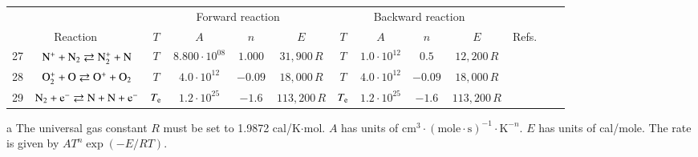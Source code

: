 \documentclass{warpdoc}
\renewcommand{\fontsizetable}{\footnotesize\scalefont{0.9}}
\begin{document}
\begin{table}[t]
\fontsizetable
\begin{center}
\begin{threeparttable}
\begin{tabular}{ccccccccccccc} 
\toprule
~&~&\multicolumn{4}{c}{Forward reaction} & \multicolumn{4}{c}{Backward reaction} & ~\\
 \cmidrule(lr){3-6}\cmidrule(lr){7-10}
\multicolumn{2}{c}{Reaction} & $T$ & $A$ & $n$ & $E$ & $T$  & $A$ & $n$ & $E$ & \multicolumn{1}{c}{Refs.}\\ 
\midrule                                          
27 & $\rm N^{+} + N_2 \rightleftarrows N_2^{+} + N $ &$T$ & $8.800 \cdot 10^{08}$ & $1.000$ & $31,900 \, R$ 
                                          &$T$ & $1.0 \cdot 10^{12}$ & $0.5$ & $12,200\, R$ & \cite{book:1990:park} \\
                                          
28 & $\rm O_2^{+} + O \rightleftarrows O^{+} + O_2$ &$T$ & $4.0 \cdot 10^{12}$ & $-0.09$ & $18,000\, R$ 
                                          &$T$ & $4.0 \cdot 10^{12}$ & $-0.09$ & $18,000\, R$ & \cite{book:1990:park} \\
                                          
                                          
29 & $\rm N_2 + e^{-} \rightleftarrows N + N + e^{-}$ &$T_{\rm e}$ & $1.2 \cdot 10^{25}$ & $-1.6$ & $113,200\, R$ 
                                          &$T_{\rm e}$ & $1.2 \cdot 10^{25}$ & $-1.6$ & $113,200\, R$ & \cite{aiaaconf:1991:sharma} \\
                                          
                                          
\bottomrule
\end{tabular}
\begin{tablenotes}
\item[{a}] The universal gas constant $R$ must be set to 1.9872	cal/K$\cdot$mol. $A$ has units of $\textrm{cm}^3\cdot(\textrm{mole}\cdot \textrm{s})^{-1}\cdot \textrm{K}^{-n}$. $E$ has units of cal/mole. The rate is given by $A T^n \exp(-E/RT).$
\end{tablenotes}
\label{tab:thoguluva2023b}
\end{threeparttable}
\end{center}
\end{table}
%
\end{document}
